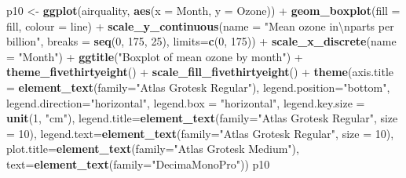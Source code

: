 \documentclass[]{article}
\newenvironment{Shaded}{\begin{snugshade}}{\end{snugshade}}
\newcommand{\KeywordTok}[1]{\textcolor[rgb]{0.13,0.29,0.53}{\textbf{{#1}}}}
\newcommand{\DataTypeTok}[1]{\textcolor[rgb]{0.13,0.29,0.53}{{#1}}}
\newcommand{\DecValTok}[1]{\textcolor[rgb]{0.00,0.00,0.81}{{#1}}}
\newcommand{\CharTok}[1]{\textcolor[rgb]{0.31,0.60,0.02}{{#1}}}
\newcommand{\StringTok}[1]{\textcolor[rgb]{0.31,0.60,0.02}{{#1}}}
\newcommand{\NormalTok}[1]{{#1}}
\begin{document}
\begin{Shaded}
\begin{Highlighting}[]
\NormalTok{p10 <-}\StringTok{ }\KeywordTok{ggplot}\NormalTok{(airquality, }\KeywordTok{aes}\NormalTok{(}\DataTypeTok{x =} \NormalTok{Month, }\DataTypeTok{y =} \NormalTok{Ozone)) +}\StringTok{ }
\StringTok{  }\KeywordTok{geom_boxplot}\NormalTok{(}\DataTypeTok{fill =} \NormalTok{fill, }\DataTypeTok{colour =} \NormalTok{line) +}
\StringTok{  }\KeywordTok{scale_y_continuous}\NormalTok{(}\DataTypeTok{name =} \StringTok{"Mean ozone in}\CharTok{\textbackslash{}n}\StringTok{parts per billion"}\NormalTok{,}
    \DataTypeTok{breaks =} \KeywordTok{seq}\NormalTok{(}\DecValTok{0}\NormalTok{, }\DecValTok{175}\NormalTok{, }\DecValTok{25}\NormalTok{), }\DataTypeTok{limits=}\KeywordTok{c}\NormalTok{(}\DecValTok{0}\NormalTok{, }\DecValTok{175}\NormalTok{)) +}
\StringTok{  }\KeywordTok{scale_x_discrete}\NormalTok{(}\DataTypeTok{name =} \StringTok{"Month"}\NormalTok{) +}
\StringTok{  }\KeywordTok{ggtitle}\NormalTok{(}\StringTok{"Boxplot of mean ozone by month"}\NormalTok{) +}
\StringTok{  }\KeywordTok{theme_fivethirtyeight}\NormalTok{() +}\StringTok{ }\KeywordTok{scale_fill_fivethirtyeight}\NormalTok{() +}\StringTok{   }
\StringTok{  }\KeywordTok{theme}\NormalTok{(}\DataTypeTok{axis.title =} \KeywordTok{element_text}\NormalTok{(}\DataTypeTok{family=}\StringTok{"Atlas Grotesk Regular"}\NormalTok{),}
    \DataTypeTok{legend.position=}\StringTok{"bottom"}\NormalTok{, }
    \DataTypeTok{legend.direction=}\StringTok{"horizontal"}\NormalTok{,}
    \DataTypeTok{legend.box =} \StringTok{"horizontal"}\NormalTok{, }
    \DataTypeTok{legend.key.size =} \KeywordTok{unit}\NormalTok{(}\DecValTok{1}\NormalTok{, }\StringTok{"cm"}\NormalTok{),}
    \DataTypeTok{legend.title=}\KeywordTok{element_text}\NormalTok{(}\DataTypeTok{family=}\StringTok{"Atlas Grotesk Regular"}\NormalTok{, }\DataTypeTok{size =} \DecValTok{10}\NormalTok{),}
    \DataTypeTok{legend.text=}\KeywordTok{element_text}\NormalTok{(}\DataTypeTok{family=}\StringTok{"Atlas Grotesk Regular"}\NormalTok{, }\DataTypeTok{size =} \DecValTok{10}\NormalTok{),}
    \DataTypeTok{plot.title=}\KeywordTok{element_text}\NormalTok{(}\DataTypeTok{family=}\StringTok{"Atlas Grotesk Medium"}\NormalTok{), }
    \DataTypeTok{text=}\KeywordTok{element_text}\NormalTok{(}\DataTypeTok{family=}\StringTok{"DecimaMonoPro"}\NormalTok{)) }
\NormalTok{p10}
\end{Highlighting}
\end{Shaded}
\end{document}
